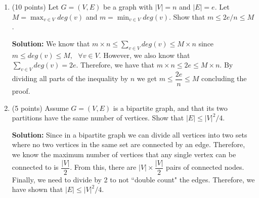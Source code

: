 \documentclass[11pt]{article}
\begin{document}
\begin{enumerate}
\textbf{Solution: }
\begin{proof}

Let's begin by evaluating the left hand side.  We can rewrite ${n\choose r}{r\choose k}$ as 
$$ \dfrac{n!}{r!(n-r)!} \times \dfrac{r!}{k!(r-k)!} $$
From here we can cross out the $r!$ on the top and bottom which leaves us with:
$$ \dfrac{n!}{k!(n-r)!(r-k)!} $$
\\
Now, if we evaluate the right hand side of the equation we have ${n\choose k}{n-k\choose r-k}$ which is equivalent to
$$ \dfrac{n!}{k!(n-k)!} \times \dfrac{(n-k)!}{(r-k)!(n-k-r+k)!} $$
$$ = \dfrac{n!}{k!(n-r)!(r-k)!} $$
From here we can see that the two terms are equal and the identity is proven.  

\end{proof}

\item (10 points) Let $G = (V,E)$ be a graph with $|V|=n$ and $|E|=e$.
Let $M = \max_{v\in V} deg(v)$ and $m = \min_{v\in V} deg(v)$.
Show that $m\leq 2e/n \leq M$.

\textbf{Solution: }
We know that $m \times n \leq \sum\limits_{v \in V} deg(v) \leq M \times n$ since $m \leq deg(v) \leq M, \text{ } \forall v \in V$.  
However, we also know that $\sum\limits_{v \in V} deg(v) = 2e$.  Therefore, we have that $m \times n \leq 2e \leq M \times n$.  By dividing all parts of the inequality by $n$ we get $m \leq \dfrac{2e}{n} \leq M$ concluding the proof.  

\item (5 points) Assume $G = (V,E)$ is a bipartite graph, and that its two partitions have the same number of vertices. Show that $|E| \leq |V|^2/4$.

\textbf{Solution: }
Since in a bipartite graph we can divide all vertices into two sets where no two vertices in the same set are connected by an edge.  Therefore, we know the maximum number of vertices that any single vertex can be connected to is $\dfrac{|V|}{2}$.  From this, there are $|V| \times \dfrac{|V|}{2}$ pairs of connected nodes.  Finally, we need to divide by 2 to not ``double count" the edges.  Therefore, we have shown that $|E| \leq |V|^2/4$.  

\end{enumerate}
\end{document}
